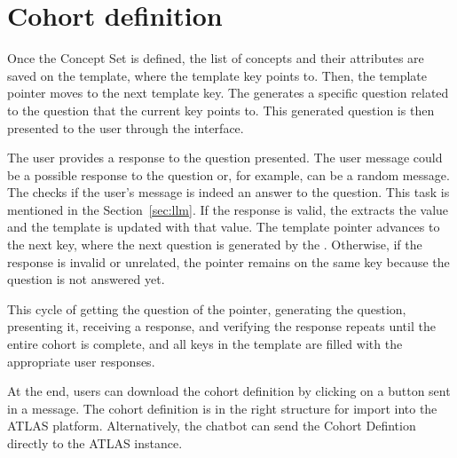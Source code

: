 \section{Cohort definition}




Once the Concept Set is defined, the list of concepts and their attributes are saved on the template, where the template key points to. Then, the template pointer moves to the next template key. The {\llm} generates a specific question related to the question that the current key points to. This generated question is then presented to the user through the interface.

The user provides a response to the question presented. The user message could be a possible response to the question or, for example, can be a random message. The {\llm} checks if the user's message is indeed an answer to the question. This task is mentioned in the Section~\ref{sec:llm}. If the response is valid, the {\llm} extracts the value and the template is updated with that value. The template pointer advances to the next key, where the next question is generated by the {\llm}. Otherwise, if the response is invalid or unrelated, the pointer remains on the same key because the question is not answered yet.

This cycle of getting the question of the pointer, generating the question, presenting it, receiving a response, and verifying the response repeats until the entire cohort is complete, and all keys in the template are filled with the appropriate user responses.

At the end, users can download the cohort definition by clicking on a button sent in a message. The cohort definition is in the right structure for import into the ATLAS platform. Alternatively, the chatbot can send the Cohort Defintion directly to the ATLAS instance.


